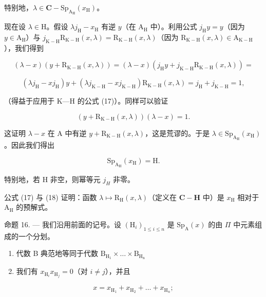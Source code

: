 特别地，\(\lambda \in \mathbf{C} - \mathrm{Sp}_{\mathrm{A_H}}(x_\mathrm{H})\)。

现在设 \(\lambda\in\mathrm{H}\)。假设 \(\lambda j_{\mathrm{H}}-x_{\mathrm{H}}\) 有逆 \(y\)（在 \(\mathrm{A}_{\mathrm{H}}\) 中）。利用公式 \(j_{\mathrm{H}}y=y\)（因为 \(y\in\mathrm{A}_{\mathrm{H}}\)）与 \(j_{\mathrm{K-H}}\mathrm{R}_{\mathrm{K-H}}(x,\lambda)=\mathrm{R}_{\mathrm{K-H}}(x,\lambda)\)（因为 \(\mathrm{R}_{\mathrm{K-H}}(x,\lambda)\in\mathrm{A}_{\mathrm{K-H}}\)），我们得到

\[
(\lambda - x) (y + \mathrm{R} _ {\mathrm{K-H}} (x, \lambda)) = (\lambda - x) (j _ {\mathrm{H}} y + j _ {\mathrm{K-H}} \mathrm{R} _ {\mathrm{K-H}} (x, \lambda)) =
\]

\[
(\lambda j _ {\mathrm{H}} - x j _ {\mathrm{H}}) y + (\lambda j _ {\mathrm {K-H}} - x j _ {\mathrm {K-H}}) \mathrm{R} _ {\mathrm {K-H}} (x, \lambda) = j _ {\mathrm{H}} + j _ {\mathrm {K-H}} = 1,
\]

（得益于应用于 K---H 的公式 (17)）。同样可以验证

\[
(y + \mathrm{R} _ {\mathrm{K-H}} (x, \lambda)) (\lambda - x) = 1.
\]

这证明 \(\lambda - x\) 在 A 中有逆 \(y + \mathrm{R}_{\mathrm{K - H}}(x, \lambda)\)，这是荒谬的。于是 \(\lambda \in \mathrm{Sp}_{\mathrm{A_H}}(x_{\mathrm{H}})\)。因此我们得出

\[
\mathrm{Sp} _ {\mathrm{A} _ {\mathrm{H}}} (x _ {\mathrm{H}}) = \mathrm{H}.\tag{18}
\]

特别地，若 H 非空，则幂等元 \(j_{H}\) 非零。

公式 (17) 与 (18) 证明：函数 \(\lambda \mapsto \mathrm{R}_{\mathrm{H}}(x,\lambda)\)（定义在 \(\mathbf{C} - \mathbf{H}\) 中）是 \(x_{\mathrm{H}}\) 相对于 \(\mathrm{A_H}\) 的预解式。

命题 16. --- 我们沿用前面的记号。设 \((\mathrm{H}_{i})_{1\leqslant i\leqslant n}\) 是 \(\mathrm{Sp}_{\mathrm{A}}(x)\) 的由 \(\Pi\) 中元素组成的一个分划。

\begin{enumerate}
\def\labelenumi{\alph{enumi})}
\item
  代数 B 典范地等同于代数 \(\mathrm{B_{H_1}}\times \dots \times \mathrm{B_{H_n}}\)
\item
  我们有 \(x_{\mathrm{H}_i}x_{\mathrm{H}_j} = 0\)（对 \(i\neq j\)），并且
\end{enumerate}

\[
x = x _ {\mathrm{H} _ {1}} + x _ {\mathrm{H} _ {2}} + \dots + x _ {\mathrm{H} _ {n}};
\]

